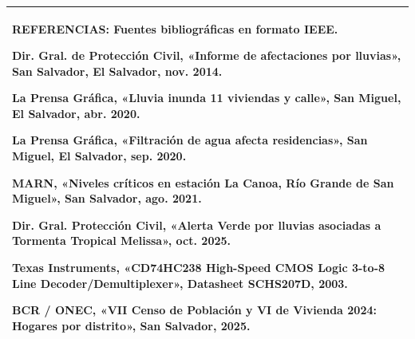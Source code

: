 \documentclass[11pt,letterpaper]{article}
\begin{document}
\begin{tabularx}{\linewidth}{|X|}
  \textbf{REFERENCIAS:} Fuentes bibliográficas en formato IEEE.\par\vspace{0.3em}
  {\fontsize{8.5}{10}\selectfont
  [1] Dir. Gral. de Protección Civil, «Informe de afectaciones por lluvias», San Salvador, El Salvador, nov. 2014.\par
  [2] La Prensa Gráfica, «Lluvia inunda 11 viviendas y calle», San Miguel, El Salvador, abr. 2020.\par
  [3] La Prensa Gráfica, «Filtración de agua afecta residencias», San Miguel, El Salvador, sep. 2020.\par
  [4] MARN, «Niveles críticos en estación La Canoa, Río Grande de San Miguel», San Salvador, ago. 2021.\par
  [5] Dir. Gral. Protección Civil, «Alerta Verde por lluvias asociadas a Tormenta Tropical Melissa», oct. 2025.\par
  [6] Texas Instruments, «CD74HC238 High-Speed CMOS Logic 3-to-8 Line Decoder/Demultiplexer», Datasheet SCHS207D, 2003.\par
  [7] BCR / ONEC, «VII Censo de Población y VI de Vivienda 2024: Hogares por distrito», San Salvador, 2025.\par}
  \vspace{0.3em}\strut\\
  \hline
\end{tabularx}
\end{document}

